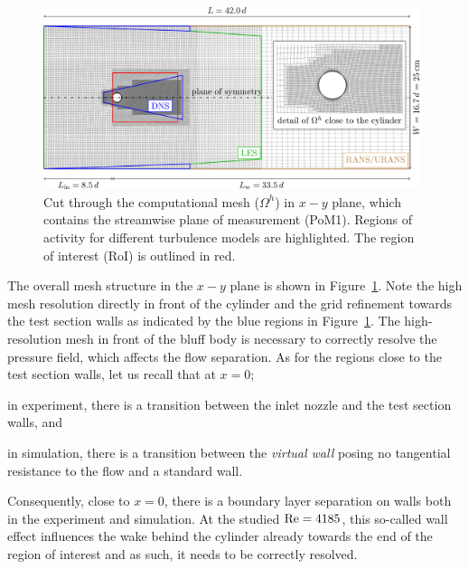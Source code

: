 \begin{figure}[htbp]
    \includegraphics[width=0.98\textwidth]{02_images/00_export/figure2.png}
    \caption{Cut through the computational mesh ($\Omega^{h}$) in $x-y$ plane, which contains the streamwise plane of measurement (PoM1). Regions of activity for different turbulence models are highlighted. The region of interest (RoI) is outlined in red.}
    \label{fig:compMesh}
\end{figure}

The overall mesh structure in the $x-y$ plane is shown in Figure~\ref{fig:compMesh}. Note the high mesh resolution directly in front of the cylinder and the grid refinement towards the test section walls as indicated by the blue regions in Figure~\ref{fig:compMesh}. The high-resolution mesh in front of the bluff body is necessary to correctly resolve the pressure field, which affects the flow separation. As for the regions close to the test section walls, let us recall that at $x = 0$;
\begin{inparaenum}[(i)]
 \item in experiment, there is a transition between the inlet nozzle and the test section walls, and
 \item in simulation, there is a transition between the \textit{virtual wall} posing no tangential resistance to the flow and a standard wall.
\end{inparaenum}
Consequently, close to $x = 0$, there is a boundary layer separation on walls both in the experiment and simulation. At the studied $\mathrm{Re} = 4185$, this so-called wall effect influences the wake behind the cylinder already towards the end of the region of interest and as such, it needs to be correctly resolved.

